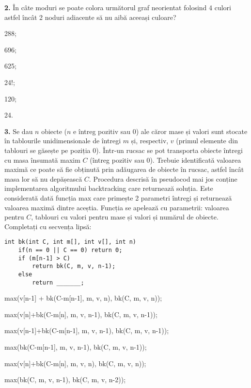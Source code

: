 \documentclass[11pt, a4paper]{article}
\begin{document}
\vspace{0.5cm}

\textbf{2.}\newline
În câte moduri se poate colora următorul graf neorientat folosind 4 culori astfel încât 2 noduri adiacente să nu aibă aceeași culoare?
\begin{inparaenum}
    \item 288;
    \item 696;
    \item 625;
    \item 24!;
    \item 120;
    \item 24.
\end{inparaenum}

\vspace{0.5cm}

\textbf{3.}\newline
Se dau $n$ obiecte ($n$ e întreg pozitiv sau $0$) ale căror mase și valori sunt stocate în tablourile unidimensionale de întregi $m$ și, respectiv, $v$ (primul elemente din tablouri se găsește pe poziția $0$). Într-un rucsac se pot transporta obiecte întregi cu masa însumată maxim $C$ (întreg pozitiv sau $0$). Trebuie identificată valoarea maximă ce poate să fie obținută prin adăugarea de obiecte în rucsac, astfel încât masa lor să nu depășească $C$. Procedura descrisă în pseudocod mai jos conține implementarea algoritmului backtracking care returnează soluția. Este considerată dată funcția max care primește 2 parametri întregi și returnează valoarea maximă dintre aceștia. Funcția se apelează cu parametrii: valoarea pentru $C$, tablouri cu valori pentru mase și valori și numărul de obiecte. Completați cu secvența lipsă:
\begin{lstlisting}
int bk(int C, int m[], int v[], int n)
    if(n == 0 || C == 0) return 0;
    if (m[n-1] > C)
        return bk(C, m, v, n-1);
    else
        return _______;
\end{lstlisting}

\begin{inparaenum}
    \item max(v[n-1] + bk(C-m[n-1], m, v, n), bk(C, m, v, n));
    \item max(v[n]+bk(C-m[n], m, v, n-1), bk(C, m, v, n-1));
    \item max(v[n-1]+bk(C-m[n-1], m, v, n-1), bk(C, m, v, n-1));
    \item max(bk(C-m[n-1], m, v, n-1), bk(C, m, v, n-1));
    \item max(v[n]+bk(C-m[n], m, v, n), bk(C, m, v, n));
    \item max(bk(C, m, v, n-1), bk(C, m, v, n-2));
\end{inparaenum}
\vspace{0.5cm}
\end{document}
